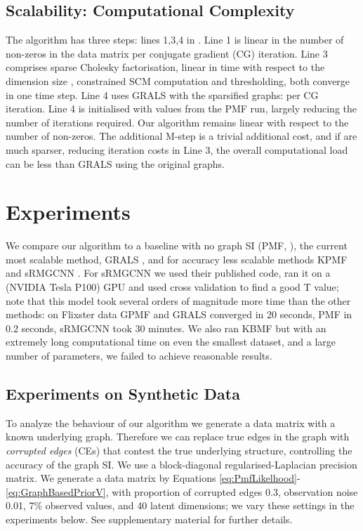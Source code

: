 \documentclass{article}
\theoremstyle{plain}
\theoremstyle{definition}
\theoremstyle{remark}
\begin{document}
\subsection{Scalability: Computational Complexity}

The algorithm has three steps: lines 1,3,4 in . Line 1 is linear in the number of non-zeros  in the data matrix  per conjugate gradient (CG) iteration. Line 3 comprises sparse Cholesky factorisation, linear in time with respect to the dimension size , constrained SCM computation and thresholding,  both converge in one time step. Line 4 uses GRALS with the sparsified graphs:  per CG iteration. Line 4 is initialised with  values from the PMF run, largely reducing the number of iterations required. Our algorithm remains linear with respect to the number of non-zeros. The additional M-step is a trivial additional cost, and if  are much sparser, reducing iteration costs in Line 3, the overall computational load can be less than GRALS using the original graphs.



\section{Experiments} \label{sec:experiments}
We compare our algorithm to a baseline with no graph SI (PMF, \cite{mnih2008probabilistic}), the current most scalable method, GRALS \cite{rao2015collaborative}, and for accuracy less scalable methods KPMF \cite{zhou2012kernelized} and sRMGCNN \cite{monti2017geometric}. For sRMGCNN we used their published code, ran it on a (NVIDIA Tesla P100) GPU and used cross validation to find a good T value; note that this model took several orders of magnitude more time than the other methods: on Flixster data GPMF and GRALS converged in 20 seconds, PMF in 0.2 seconds, sRMGCNN took 30 minutes. We also ran KBMF \cite{gonen2013kernelized} but with an extremely long computational time on even the smallest dataset, and a large number of parameters, we failed to achieve reasonable results.

\subsection{Experiments on Synthetic Data} \label{sec:synthetic_experiments}
To analyze the behaviour of our algorithm we generate a data matrix with a known underlying graph.
Therefore we can replace true edges in the graph with \textit{corrupted edges} (CEs) that contest the true underlying structure, controlling the accuracy of the graph SI. We use a block-diagonal regularised-Laplacian precision matrix. 
We generate a  data matrix by Equations \eqref{eq:PmfLikelhood}-\eqref{eq:GraphBasedPriorV}, with proportion of corrupted edges 0.3, observation noise 0.01, 7\% observed values, and 40 latent dimensions;
we vary these settings in the experiments below.
See supplementary material for further 
details. 
\end{document}
